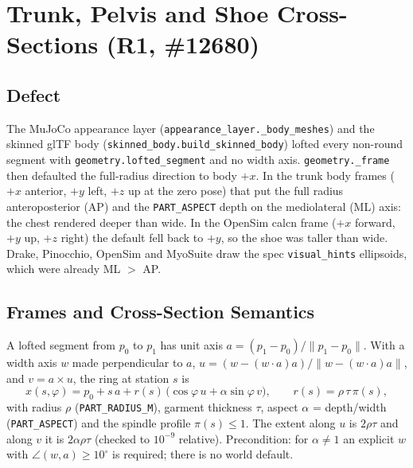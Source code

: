 \section{Trunk, Pelvis and Shoe Cross-Sections (R1, \#12680)}

\subsection{Defect}
The MuJoCo appearance layer (\texttt{appearance\_layer.\_body\_meshes}) and the
skinned glTF body (\texttt{skinned\_body.build\_skinned\_body}) lofted every
non-round segment with \texttt{geometry.lofted\_segment} and no width axis.
\texttt{geometry.\_frame} then defaulted the full-radius direction to body $+x$.
In the trunk body frames ($+x$ anterior, $+y$ left, $+z$ up at the zero pose)
that put the full radius anteroposterior (AP) and the \texttt{PART\_ASPECT}
depth on the mediolateral (ML) axis: the chest rendered deeper than wide. In the
OpenSim calcn frame ($+x$ forward, $+y$ up, $+z$ right) the default fell back to
$+y$, so the shoe was taller than wide. Drake, Pinocchio, OpenSim and MyoSuite
draw the spec \texttt{visual\_hints} ellipsoids, which were already ML $>$ AP.

\subsection{Frames and Cross-Section Semantics}
A lofted segment from $p_0$ to $p_1$ has unit axis
$a=(p_1-p_0)/\lVert p_1-p_0\rVert$. With a width axis $w$ made perpendicular to
$a$, $u = (w-(w\cdot a)a)/\lVert w-(w\cdot a)a\rVert$, and $v = a\times u$, the ring
at station $s$ is
\[
x(s,\varphi) = p_0 + s\,a + r(s)\,\bigl(\cos\varphi\,u + \alpha\sin\varphi\,v\bigr),
\qquad r(s) = \rho\,\tau\,\pi(s),
\]
with radius $\rho$ (\texttt{PART\_RADIUS\_M}), garment thickness $\tau$, aspect
$\alpha$ = depth/width (\texttt{PART\_ASPECT}) and the spindle profile
$\pi(s)\le 1$. The extent along $u$ is $2\rho\tau$ and along $v$ it is
$2\alpha\rho\tau$ (checked to $10^{-9}$ relative). Precondition: for
$\alpha\ne 1$ an explicit $w$ with $\angle(w,a)\ge 10^\circ$ is required; there is
no world default.

